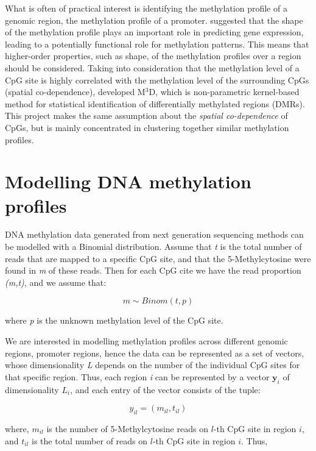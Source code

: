 What is often of practical interest is identifying the methylation profile of a genomic region, \eg the methylation profile of a promoter. \cite{Vanderkraats2013} suggested that the shape of the methylation profile plays an important role in predicting gene expression, leading to a potentially functional role for methylation patterns. This means that higher-order properties, such as shape, of the methylation profiles over a region should be considered. Taking into consideration that the methylation level of a CpG site is highly correlated with the methylation level of the surrounding CpGs (\ie spatial co-dependence), \cite{Mayo2014} developed M$^3$D, which is non-parametric kernel-based method for statistical identification of differentially methylated regions (DMRs). This project makes the same assumption about the \emph{spatial co-dependence} of CpGs, but is mainly concentrated in clustering together similar methylation profiles.

\section{Modelling DNA methylation profiles}
DNA methylation data generated from next generation sequencing methods can be modelled with a Binomial distribution. Assume that \emph{t} is the total number of reads that are mapped to a specific CpG site, and that the 5-Methylcytosine were found in \emph{m} of these reads. Then for each CpG cite we have the read proportion \emph{(m,t)}, and we assume that:

\begin{equation} \label{binom-1d-f}
	m \sim Binom(t, p)
\end{equation}

where \emph{p} is the unknown methylation level of the CpG site.

We are interested in modelling methylation profiles across different genomic regions, \eg promoter regions, hence the data can be represented as a set of vectors, whose dimensionality \emph{L} depends on the number of the individual CpG sites for that specific region. Thus, each region \emph{i} can be represented by a vector $\mathbf{y}_{i}$ of dimensionality $L_{i}$, and each entry of the vector consists of the tuple:

\begin{equation}
	y_{il} = (m_{il},t_{il})
\end{equation}

where, $m_{il}$ is the number of 5-Methylcytosine reads on $l$-th CpG site in region $i$, and $t_{il}$ is the total number of reads on $l$-th CpG site in region $i$. Thus, 

